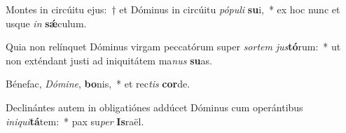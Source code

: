 \item Montes in circúitu ejus:~† et Dóminus in circúitu \textit{pó}\textit{pu}\textit{li} \textbf{su}i,~* ex hoc nunc et usque \textit{in} \textbf{sǽ}culum.
\item Quia non relínquet Dóminus virgam peccatórum super \textit{sor}\textit{tem} \textit{jus}\textbf{tó}rum:~* ut non exténdant justi ad iniquitátem ma\textit{nus} \textbf{su}as.
\item Bénefac, \textit{Dó}\textit{mi}\textit{ne}, \textbf{bo}nis,~* et rec\textit{tis} \textbf{cor}de.
\item Declinántes autem in obligatiónes addúcet Dóminus cum operántibus \textit{in}\textit{i}\textit{qui}\textbf{tá}tem:~* pax su\textit{per} \textbf{Is}raël.
